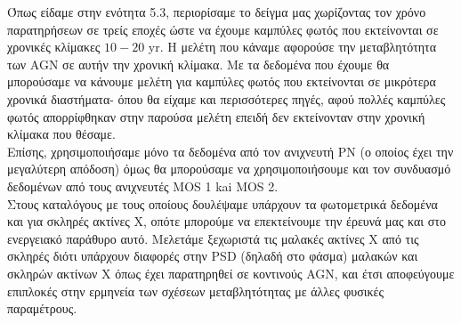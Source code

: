 Όπως είδαμε στην ενότητα 5.3, περιορίσαμε το δείγμα μας χωρίζοντας τον χρόνο παρατηρήσεων σε τρείς εποχές ώστε να έχουμε καμπύλες φωτός που εκτείνονται σε χρονικές κλίμακες $10-20$ \textlatin{yr}. Η μελέτη που κάναμε αφορούσε την μεταβλητότητα των \textlatin{AGN} σε αυτήν την χρονική κλίμακα. Με τα δεδομένα που έχουμε θα μπορούσαμε να κάνουμε μελέτη για καμπύλες φωτός που εκτείνονται σε μικρότερα χρονικά διαστήματα- όπου θα είχαμε και περισσότερες πηγές, αφού πολλές καμπύλες φωτός απορρίφθηκαν στην παρούσα μελέτη επειδή δεν εκτείνονταν στην χρονική κλίμακα που θέσαμε.\\
Επίσης, χρησιμοποιήσαμε μόνο τα δεδομένα από τον ανιχνευτή ΡΝ (ο οποίος έχει την μεγαλύτερη απόδοση) όμως θα μπορούσαμε να χρησιμοποιήσουμε και τον συνδυασμό δεδομένων από τους ανιχνευτές \textlatin{MOS 1} kai \textlatin{MOS 2}.\\
Στους καταλόγους με τους οποίους δουλέψαμε υπάρχουν τα φωτομετρικά δεδομένα και για σκληρές ακτίνες Χ, οπότε μπορούμε να επεκτείνουμε την έρευνά μας και στο ενεργειακό παράθυρο αυτό. Μελετάμε ξεχωριστά τις μαλακές ακτίνες Χ από τις σκληρές διότι υπάρχουν διαφορές στην \textlatin{PSD} (δηλαδή στο φάσμα) μαλακών και σκληρών ακτίνων Χ όπως έχει παρατηρηθεί σε κοντινούς \textlatin{AGN}, και έτσι αποφεύγουμε επιπλοκές στην ερμηνεία των σχέσεων μεταβλητότητας με άλλες φυσικές παραμέτρους\cite{2006ASPC..360...85M}. 


    
    
